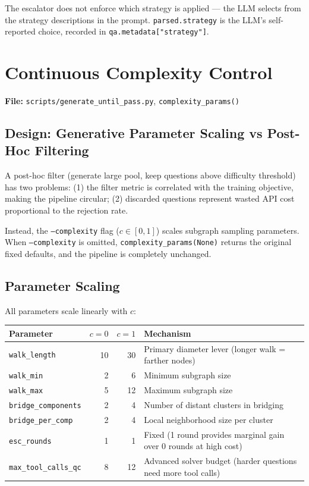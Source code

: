 \documentclass[11pt,a4paper]{article}
\begin{document}
The escalator does not enforce which strategy is applied — the LLM selects from the strategy descriptions in the prompt. \texttt{parsed.strategy} is the LLM's self-reported choice, recorded in \texttt{qa.metadata["strategy"]}.

\section{Continuous Complexity Control}
\label{sec:complexity}

\textbf{File:} \texttt{scripts/generate\_until\_pass.py}, \texttt{complexity\_params()}

\subsection{Design: Generative Parameter Scaling vs Post-Hoc Filtering}

A post-hoc filter (generate large pool, keep questions above difficulty threshold) has two problems: (1) the filter metric is correlated with the training objective, making the pipeline circular; (2) discarded questions represent wasted API cost proportional to the rejection rate.

Instead, the \texttt{--complexity} flag ($c \in [0,1]$) scales subgraph sampling parameters. When \texttt{--complexity} is omitted, \texttt{complexity\_params(None)} returns the original fixed defaults, and the pipeline is completely unchanged.

\subsection{Parameter Scaling}

All parameters scale linearly with $c$:

\begin{tabular}{lrrl}
\toprule
\textbf{Parameter} & $c=0$ & $c=1$ & \textbf{Mechanism} \\
\midrule
\texttt{walk\_length}        & 10 & 30 & Primary diameter lever (longer walk = farther nodes) \\
\texttt{walk\_min}           &  2 &  6 & Minimum subgraph size \\
\texttt{walk\_max}           &  5 & 12 & Maximum subgraph size \\
\texttt{bridge\_components}  &  2 &  4 & Number of distant clusters in bridging \\
\texttt{bridge\_per\_comp}   &  2 &  4 & Local neighborhood size per cluster \\
\texttt{esc\_rounds}         &  1 &  1 & Fixed (1 round provides marginal gain over 0 rounds at high cost) \\
\texttt{max\_tool\_calls\_qc}& 8  & 12 & Advanced solver budget (harder questions need more tool calls) \\
\bottomrule
\end{tabular}
\end{document}
